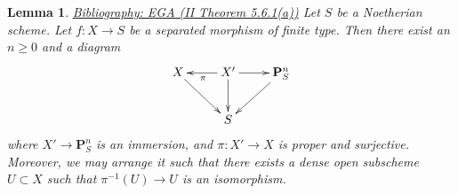 \documentclass{amsart}
\newenvironment{reference}{\comment}{\endcomment}
\theoremstyle{plain}
\newtheorem{lemma}[subsection]{Lemma}
\theoremstyle{definition}
\theoremstyle{remark}
\numberwithin{equation}{subsection}
\begin{document}
\begin{lemma}
\label{coherent-lemma-chow-Noetherian}
\begin{reference}
\href{https://stacks.math.columbia.edu/bibliography}{Bibliography: EGA (II Theorem 5.6.1(a))}
\end{reference}
Let $S$ be a Noetherian scheme.
Let $f : X \to S$ be a separated morphism of finite type.
Then there exist an $n \geq 0$ and a diagram
$$
\xymatrix{
X \ar[rd] & X' \ar[d] \ar[l]^\pi \ar[r] & \mathbf{P}^n_S \ar[dl] \\
& S &
}
$$
where $X' \to \mathbf{P}^n_S$ is an immersion, and
$\pi : X' \to X$ is proper and surjective. Moreover, we may
arrange it such that there exists a dense open subscheme
$U \subset X$ such that $\pi^{-1}(U) \to U$ is an isomorphism.
\end{lemma}
\end{document}

